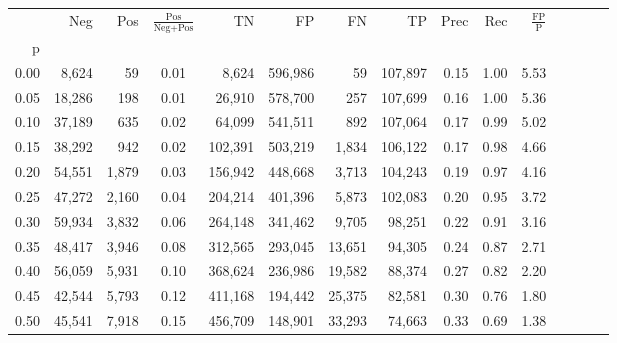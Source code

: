 \begin{tabular}{rrrcrrrrrrrrrrr}
\toprule
{} &     Neg &    Pos & $\frac{\text{Pos}}{\text{Neg}+\text{Pos}}$ &       TN &       FP &       FN &       TP &  Prec &   Rec & $\frac{\text{FP}}{\text{P}}$ \\
p    &         &        &                                            &          &          &          &          &       &       &                              \\
\midrule
0.00 &   8,624 &     59 &                                       0.01 &    8,624 &  596,986 &       59 &  107,897 &  0.15 &  1.00 &                         5.53 \\
0.05 &  18,286 &    198 &                                       0.01 &   26,910 &  578,700 &      257 &  107,699 &  0.16 &  1.00 &                         5.36 \\
0.10 &  37,189 &    635 &                                       0.02 &   64,099 &  541,511 &      892 &  107,064 &  0.17 &  0.99 &                         5.02 \\
0.15 &  38,292 &    942 &                                       0.02 &  102,391 &  503,219 &    1,834 &  106,122 &  0.17 &  0.98 &                         4.66 \\
0.20 &  54,551 &  1,879 &                                       0.03 &  156,942 &  448,668 &    3,713 &  104,243 &  0.19 &  0.97 &                         4.16 \\
0.25 &  47,272 &  2,160 &                                       0.04 &  204,214 &  401,396 &    5,873 &  102,083 &  0.20 &  0.95 &                         3.72 \\
0.30 &  59,934 &  3,832 &                                       0.06 &  264,148 &  341,462 &    9,705 &   98,251 &  0.22 &  0.91 &                         3.16 \\
0.35 &  48,417 &  3,946 &                                       0.08 &  312,565 &  293,045 &   13,651 &   94,305 &  0.24 &  0.87 &                         2.71 \\
0.40 &  56,059 &  5,931 &                                       0.10 &  368,624 &  236,986 &   19,582 &   88,374 &  0.27 &  0.82 &                         2.20 \\
0.45 &  42,544 &  5,793 &                                       0.12 &  411,168 &  194,442 &   25,375 &   82,581 &  0.30 &  0.76 &                         1.80 \\
0.50 &  45,541 &  7,918 &                                       0.15 &  456,709 &  148,901 &   33,293 &   74,663 &  0.33 &  0.69 &                         1.38 \\

\end{tabular}
